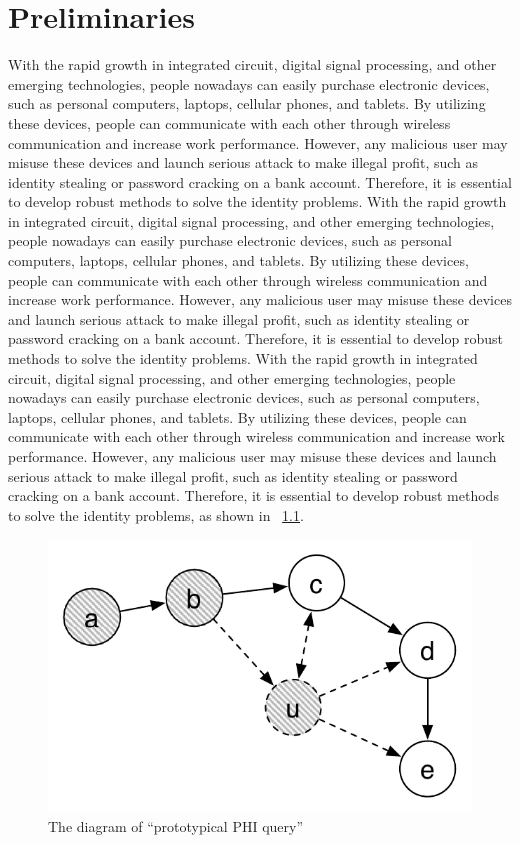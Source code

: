 \chapter{Preliminaries}
\label{sec:preliminaries}

With the rapid growth in integrated circuit, digital signal processing, and other emerging technologies, people nowadays can easily purchase electronic devices, such as personal computers, laptops, cellular phones, and tablets.  
By utilizing these devices, people can communicate with each other through wireless communication and increase work performance.      
However, any malicious user may misuse these devices and launch serious attack to make illegal profit, such as identity stealing or password cracking on a bank account.
Therefore, it is essential to develop robust methods to solve the identity problems.
With the rapid growth in integrated circuit, digital signal processing, and other emerging technologies, people nowadays can easily purchase electronic devices, such as personal computers, laptops, cellular phones, and tablets.  
By utilizing these devices, people can communicate with each other through wireless communication and increase work performance.      
However, any malicious user may misuse these devices and launch serious attack to make illegal profit, such as identity stealing or password cracking on a bank account.
Therefore, it is essential to develop robust methods to solve the identity problems.
With the rapid growth in integrated circuit, digital signal processing, and other emerging technologies, people nowadays can easily purchase electronic devices, such as personal computers, laptops, cellular phones, and tablets.  
By utilizing these devices, people can communicate with each other through wireless communication and increase work performance.      
However, any malicious user may misuse these devices and launch serious attack to make illegal profit, such as identity stealing or password cracking on a bank account.
Therefore, it is essential to develop robust methods to solve the identity problems, as shown in
~\ref{fig:PHI}.

\begin{figure}[t!]
  \begin{center}
    \includegraphics[width=1.0\textwidth]{figures/dyna_rm.pdf}
    \caption{The diagram of ``prototypical PHI query''} 
    \label{fig:PHI}
  \end{center}
\end{figure}